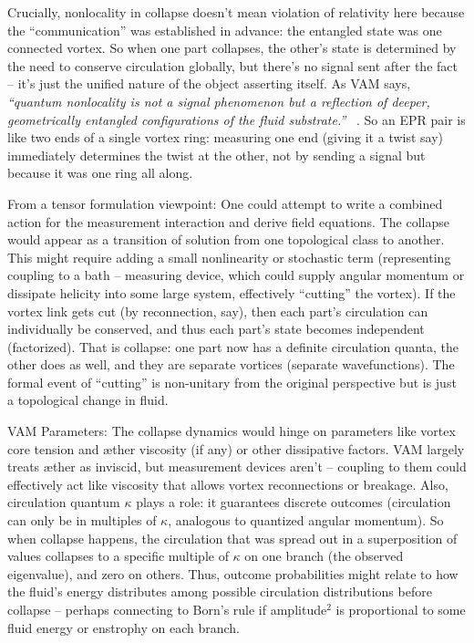 \documentclass[a4paper, aps,preprint,superscriptaddress, 12pt]{revtex4}
\begin{document}
Crucially, nonlocality in collapse doesn’t mean violation of relativity here because the “communication” was established in advance: the entangled state was one connected vortex. So when one part collapses, the other’s state is determined by the need to conserve circulation globally, but there’s no signal sent after the fact – it’s just the unified nature of the object asserting itself. As VAM says, \textit{“quantum nonlocality is not a signal phenomenon but a reflection of deeper, geometrically entangled configurations of the fluid substrate.”}~\cite{Iskandarani2025c} . So an EPR pair is like two ends of a single vortex ring: measuring one end (giving it a twist say) immediately determines the twist at the other, not by sending a signal but because it was one ring all along.


From a tensor formulation viewpoint: One could attempt to write a combined action for the measurement interaction and derive field equations. The collapse would appear as a transition of solution from one topological class to another. This might require adding a small nonlinearity or stochastic term (representing coupling to a bath – measuring device, which could supply angular momentum or dissipate helicity into some large system, effectively “cutting” the vortex). If the vortex link gets cut (by reconnection, say), then each part’s circulation can individually be conserved, and thus each part’s state becomes independent (factorized). That is collapse: one part now has a definite circulation quanta, the other does as well, and they are separate vortices (separate wavefunctions). The formal event of “cutting” is non-unitary from the original perspective but is just a topological change in fluid.


VAM Parameters: The collapse dynamics would hinge on parameters like vortex core tension and æther viscosity (if any) or other dissipative factors. VAM largely treats æther as inviscid, but measurement devices aren’t – coupling to them could effectively act like viscosity that allows vortex reconnections or breakage. Also, circulation quantum $\kappa$ plays a role: it guarantees discrete outcomes (circulation can only be in multiples of $\kappa$, analogous to quantized angular momentum). So when collapse happens, the circulation that was spread out in a superposition of values collapses to a specific multiple of $\kappa$ on one branch (the observed eigenvalue), and zero on others. Thus, outcome probabilities might relate to how the fluid’s energy distributes among possible circulation distributions before collapse – perhaps connecting to Born’s rule if amplitude$^2$ is proportional to some fluid energy or enstrophy on each branch.
\end{document}
